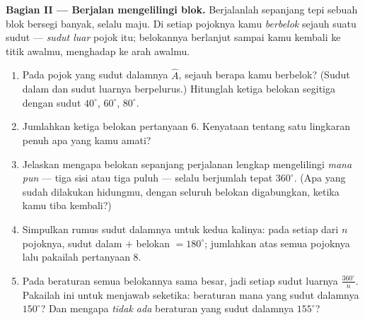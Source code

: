 \begin{problem}
\medskip
\noindent\textbf{Bagian II --- Berjalan mengelilingi blok.}
Berjalanlah sepanjang tepi sebuah blok bersegi banyak, selalu maju. Di
setiap pojoknya kamu \emph{berbelok} sejauh suatu sudut --- \emph{sudut
luar} pojok itu; belokannya berlanjut sampai kamu kembali ke titik
awalmu, menghadap ke arah awalmu.
\begin{enumerate}[resume]
  \item Pada pojok yang sudut dalamnya $\widehat A$, sejauh berapa
        kamu berbelok? (Sudut dalam dan sudut luarnya berpelurus.)
        Hitunglah ketiga belokan segitiga dengan sudut $40^\circ$,
        $60^\circ$, $80^\circ$.
  \item Jumlahkan ketiga belokan pertanyaan 6. Kenyataan tentang satu
        lingkaran penuh apa yang kamu amati?
  \item Jelaskan mengapa belokan sepanjang perjalanan lengkap
        mengelilingi  \emph{mana pun} --- tiga sisi atau
        tiga puluh --- selalu berjumlah tepat $360^\circ$. (Apa yang
        sudah dilakukan hidungmu, dengan seluruh belokan digabungkan,
        ketika kamu tiba kembali?)
  \item Simpulkan rumus sudut dalamnya untuk kedua kalinya: pada
        setiap dari $n$ pojoknya, sudut dalam $+$ belokan
        $= 180^\circ$; jumlahkan atas semua pojoknya lalu pakailah
        pertanyaan 8.
  \item Pada  beraturan semua belokannya sama besar, jadi
        setiap sudut luarnya $\frac{360^\circ}{n}$. Pakailah ini untuk
        menjawab seketika:  beraturan mana yang sudut
        dalamnya $150^\circ$? Dan mengapa \emph{tidak ada} 
        beraturan yang sudut dalamnya $155^\circ$?
\end{enumerate}


\end{problem}
